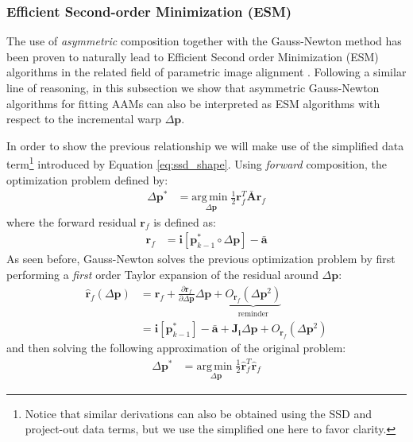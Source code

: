 \subsubsection*{Efficient Second-order Minimization (ESM)}
\label{sec:gauss_newton_alternated}

The use of \emph{asymmetric} composition together with the Gauss-Newton method has been proven to naturally lead to Efficient Second order Minimization (ESM) algorithms in the related field of parametric image alignment \cite{Malis2004, Benhimane2004, Megret2008, Megret2010}. Following a similar line of reasoning, in this subsection we show that asymmetric Gauss-Newton algorithms for fitting AAMs can also be interpreted as ESM algorithms with respect to the incremental warp $\Delta \mathbf{p}$.

In order to show the previous relationship we will make use of the simplified data term\footnote{Notice that similar derivations can also be obtained using the SSD and project-out data terms, but we use the simplified one here to favor clarity.} introduced by Equation \ref{eq:ssd_shape}. Using \emph{forward} composition, the optimization problem defined by:
\begin{equation}
    \begin{aligned}
        \Delta \mathbf{p}^* & = \underset{\Delta \mathbf{p}}{\mathrm{arg\,min\;}} \frac{1}{2} \mathbf{r}_f^T\bar{\mathbf{A}}\mathbf{r}_f
    \label{eq:po_forward}
    \end{aligned}
\end{equation}
where the forward residual $\mathbf{r}_f$ is defined as:
\begin{equation}
    \begin{aligned}
		\mathbf{r}_f & = \mathbf{i}[\mathbf{p}_{k-1}^* \circ \Delta \mathbf{p}] - \bar{\mathbf{a}}
    \label{eq:po_forward_residual}
    \end{aligned}
\end{equation}
As seen before, Gauss-Newton solves the previous optimization problem by first performing a \emph{first} order Taylor expansion of the residual around $\Delta \mathbf{p}$:
\begin{equation}
    \begin{aligned}
		\hat{\mathbf{r}}_f(\Delta\mathbf{p}) & = \mathbf{r}_f + \frac{\partial \mathbf{r}_f}{\partial\Delta \mathbf{p}}\Delta\mathbf{p} + \underbrace{O_{\mathbf{r}_f}(\Delta\mathbf{p}^2)}_{\textrm{reminder}}
		\\
		& = \mathbf{i}[\mathbf{p}_{k-1}^*] - \bar{\mathbf{a}} + \mathbf{J}_\mathbf{i}\Delta\mathbf{p} + O_{\mathbf{r}_f}(\Delta\mathbf{p}^2)
    \label{eq:po_forward_residual_taylor}
    \end{aligned}
\end{equation}
and then solving the following approximation of the original problem:
\begin{equation}
    \begin{aligned}
        \Delta\mathbf{p}^* & = \underset{\Delta\mathbf{p}}{\mathrm{arg\,min\;}} \frac{1}{2} \hat{\mathbf{r}}_f^T\hat{\mathbf{r}}_f
    \label{eq:po_forward_taylor}
    \end{aligned}
\end{equation}

